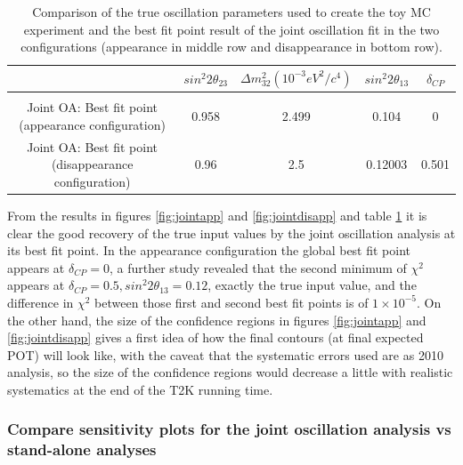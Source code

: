 \begin{table}[h]
\centering
\begin{tabular}{|c|c|c|c|c|}
\hline
  & $sin^{2}2\theta_{23}$ & $\Delta m_{32}^{2} (10^{-3} eV^{2}/c^{4})$  & $sin^{2}2\theta_{13}$ & $\delta_{CP}$ \\
\hline \hline
{\color{blue}{Toy MC experiment}} & {\color{blue}{0.96}} & {\color{blue}{2.5}} & {\color{blue}{0.12}} & {\color{blue}{0.5}} \\
Joint OA: Best fit point (appearance configuration) &  0.958& 2.499& 0.104 &  0\\
Joint OA: Best fit point (disappearance configuration) & 0.96 & 2.5 & 0.12003 & 0.501\\
\hline
\end{tabular}
\caption{ Comparison of the true oscillation parameters used to create the toy MC experiment and the best fit point result of the joint oscillation fit in the two configurations (appearance in middle row and disappearance in bottom row). }
\label{tab:jointOAbestfit}
\end{table}

From the results in figures \ref{fig:jointapp} and \ref{fig:jointdisapp} and table \ref{tab:jointOAbestfit} it is clear the good recovery of the true input values by the joint oscillation analysis at its best fit point. In the appearance configuration the global best fit point appears at $\delta_{CP}=0$, a further study revealed that the second minimum of $\chi^{2}$ appears at $\delta_{CP}=0.5, sin^{2}2\theta_{13}=0.12$, exactly the true input value, and the difference in $\chi^{2}$ between those first and second best fit points is of  $1\times10^{-5}$. On the other hand, the size of the confidence regions in figures \ref{fig:jointapp} and \ref{fig:jointdisapp} gives a first idea of how the final contours (at final expected POT) will look like, with the caveat that the systematic errors used are as 2010 analysis, so the size of the confidence regions would decrease a little with realistic systematics at the end of the T2K running time. 

\subsubsection{Compare sensitivity plots for the joint oscillation analysis vs stand-alone analyses}

